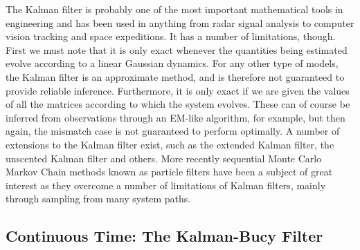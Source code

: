 The Kalman filter is probably one of the most important mathematical tools in engineering and has been used in anything from radar signal analysis to computer vision tracking and space expeditions. It has a number of limitations, though. First we must note that it is only exact whenever the quantities being estimated evolve according to a linear Gaussian dynamics. For any other type of models, the Kalman filter is an approximate method, and is therefore not guaranteed to provide reliable inference. Furthermore, it is only exact if we are given the values of all the matrices according to which the system evolves. These can of course be inferred from observations through an EM-like algorithm, for example, but then again, the mismatch case is not guaranteed to perform optimally. A number of extensions to the Kalman filter exist, such as the extended Kalman filter, the unscented Kalman filter and others. More recently sequential Monte Carlo Markov Chain methods known as particle filters have been a subject of great interest as they overcome a number of limitations of Kalman filters, mainly through sampling from many system paths.
\subsection{Continuous Time: The Kalman-Bucy Filter}

